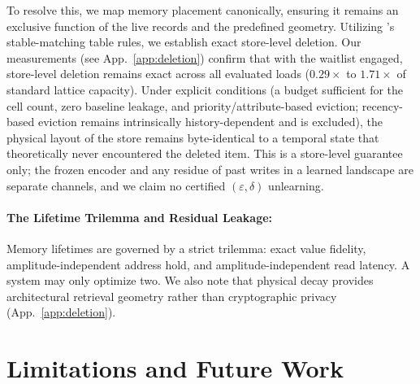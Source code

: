 \documentclass{article}
\begin{document}
To resolve this, we map memory placement canonically, ensuring it remains an exclusive function of the live records and the predefined geometry. Utilizing \citeauthor{blelloch_strongly_2007}'s \citeyearpar{blelloch_strongly_2007} stable-matching table rules, we establish exact store-level deletion. Our measurements (see App.~\ref{app:deletion}) confirm that with the waitlist engaged, store-level deletion remains exact across all evaluated loads ($0.29\times$ to $1.71\times$ of standard lattice capacity). Under explicit conditions (a budget sufficient for the cell count, zero baseline leakage, and priority/attribute-based eviction; recency-based eviction remains intrinsically history-dependent and is excluded), the physical layout of the store remains byte-identical to a temporal state that theoretically never encountered the deleted item. This is a store-level guarantee only; the frozen encoder and any residue of past writes in a learned landscape are separate channels, and we claim no certified $(\varepsilon,\delta)$ unlearning.

\paragraph{The Lifetime Trilemma and Residual Leakage:} Memory lifetimes are governed by a strict trilemma: exact value fidelity, amplitude-independent address hold, and amplitude-independent read latency. A system may only optimize two. We also note that physical decay provides architectural retrieval geometry rather than cryptographic privacy (App.~\ref{app:deletion}).


\section{Limitations and Future Work}\label{sec:limits}
\end{document}
